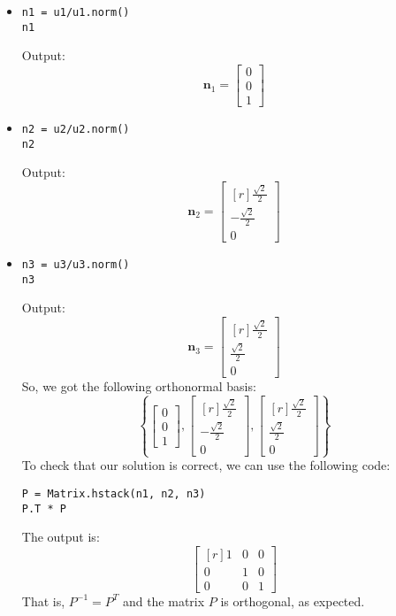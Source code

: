 \documentclass[12pt]{article}
\begin{document}
\begin{itemize}

\item 
\begin{lstlisting}
n1 = u1/u1.norm()
n1
\end{lstlisting}
Output:
\[
\mathbf{n}_1=\left[\begin{matrix}0\\0\\1\end{matrix}\right]
\]

\item 
\begin{lstlisting}
n2 = u2/u2.norm()
n2
\end{lstlisting}
Output:
\[
\mathbf{n}_2=\left[\begin{matrix*}[r]\frac{\sqrt{2}}{2}\\- \frac{\sqrt{2}}{2}\\0\end{matrix*}\right]
\]

\item 
\begin{lstlisting}
n3 = u3/u3.norm()
n3
\end{lstlisting}
Output:
\[
\mathbf{n}_3=\left[\begin{matrix*}[r]\frac{\sqrt{2}}{2}\\\frac{\sqrt{2}}{2}\\0\end{matrix*}\right]
\]
So, we got the following orthonormal basis:
\[
\left\{
\left[\begin{matrix}0\\0\\1\end{matrix}\right],
\left[\begin{matrix*}[r]\frac{\sqrt{2}}{2}\\- \frac{\sqrt{2}}{2}\\0\end{matrix*}\right],
\left[\begin{matrix*}[r]\frac{\sqrt{2}}{2}\\\frac{\sqrt{2}}{2}\\0\end{matrix*}\right]
\right\}
\]
To check that our solution is correct, we can use the following code:
\begin{lstlisting}
P = Matrix.hstack(n1, n2, n3)
P.T * P
\end{lstlisting}
The output is:
\[
\begin{bmatrix*}[r]1&0&0\\0&1&0\\0&0&1\end{bmatrix*}
\]
That is, $P^{-1}=P^T$ and the matrix $P$ is orthogonal, as expected.
\endproof

\end{itemize}
\end{document}
